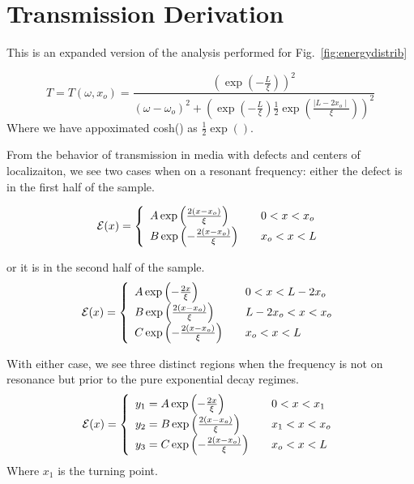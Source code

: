 \chapter{Transmission Derivation}

This is an expanded version of the analysis performed for Fig.~\ref{fig:energydistrib}

\begin{equation}
T = T(\omega, x_o) = \frac{(\exp(-\frac{L}{\xi}))^2}{ 
(\omega-\omega _o)^2 + (\exp(-\frac{L}{\xi})\frac{1}{2}\exp(\frac{\mid L-2 x_o \mid}{\xi}))^2 }
\label{fig:appendixtransmission}
\end{equation}
Where we have appoximated cosh() as $\frac{1}{2}\exp()$. 

From the behavior of transmission in media with defects and centers of localizaiton, we see two cases when on a resonant frequency:  either the defect is in the first half of the sample.%

\begin{equation}
{\cal E}(x) = \left\{ 
\begin{array}{l l}
  A \exp\left(\frac{2 (x-x_o)}{\xi}\right) & \quad 0 < x < x_o \\
  B \exp\left(-\frac{2 (x-x_o)}{\xi}\right) & \quad x_o < x < L\\
\end{array} \right.
\label{fig:left}
\end{equation}

or it is in the second half of the sample.%
\begin{equation}
{\cal E}(x) = \left\{ 
\begin{array}{l l}
 A \exp\left(-\frac{2 x}{\xi}\right) & \quad 0 < x < L-2 x_o \\
 B \exp\left(\frac{2 (x-x_o)}{\xi}\right) & \quad L-2 x_o < x < x_o \\
 C \exp\left(-\frac{2 (x-x_o)}{\xi}\right) & \quad x_o < x < L \\
\end{array} \right.
\label{fig:right}
\end{equation}

With either case, we see three distinct regions when the frequency is not on resonance but prior to the pure exponential decay regimes. %
\begin{equation}
{\cal E}(x) = \left\{ 
\begin{array}{l l}
y_1 = A \exp\left(-\frac{2 x}{\xi}\right)   & \quad 0 < x < x_1  \\
y_2 = B \exp\left(\frac{2 (x-x_o)}{\xi}\right) & \quad x_1 < x < x_o  \\
y_3 = C \exp\left(-\frac{2 (x-x_o)}{\xi}\right) & \quad  x_o < x < L \\
\end{array} \right.
\label{fig:startingequations}
\end{equation}
Where $x_1$ is the turning point.

